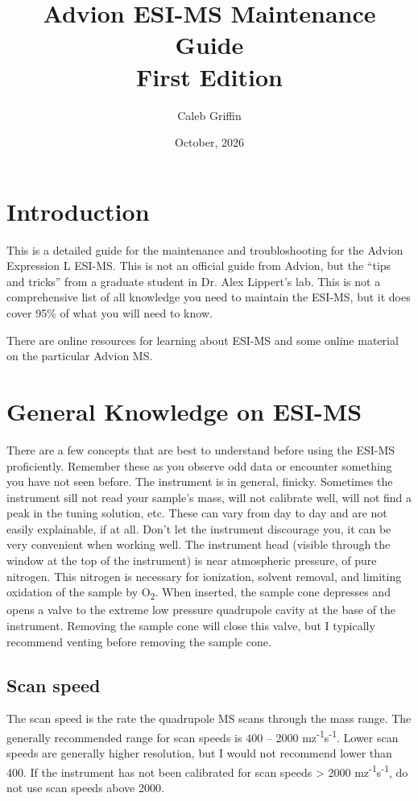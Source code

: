 \documentclass[12pt, letterpaper]{article}
\title{Advion ESI-MS Maintenance Guide\\[0.12in] \large First Edition}
\author{Caleb Griffin}
\date{October, 2026}
\begin{document}
\maketitle
\thispagestyle{empty}

\pagebreak
\tableofcontents
\pagebreak

\section{Introduction}
This is a detailed guide for the maintenance and troubloshooting for the Advion Expression L ESI-MS.
This is not an official guide from Advion, but the ``tips and tricks'' from a graduate student in Dr. Alex Lippert's lab.
This is not a comprehensive list of all knowledge you need to maintain the ESI-MS, but it does cover 95\% of what you will need to know.

There are online resources for learning about ESI-MS and some online material on the particular Advion MS.

\section{General Knowledge on ESI-MS}
There are a few concepts that are best to understand before using the ESI-MS proficiently. 
Remember these as you observe odd data or encounter something you have not seen before.
The instrument is in general, finicky.
Sometimes the instrument sill not read your sample's mass, will not calibrate well, will not find a peak in the tuning solution, etc.
These can vary from day to day and are not easily explainable, if at all.
Don't let the instrument discourage you, it can be very convenient when working well.
The instrument head (visible through the window at the top of the instrument) is near atmospheric pressure, of pure nitrogen.
This nitrogen is necessary for ionization, solvent removal, and limiting oxidation of the sample by O\textsubscript{2}.
When inserted, the sample cone depresses and opens a valve to the extreme low pressure quadrupole cavity at the base of the instrument.
Removing the sample cone will close this valve, but I typically recommend venting before removing the sample cone.

\subsection{Scan speed}
The scan speed is the rate the quadrupole MS scans through the mass range. The generally recommended range for scan speeds is 400 -- 2000 mz\textsuperscript{-1}s\textsuperscript{-1}. 
Lower scan speeds are generally higher resolution, but I would not recommend lower than 400.
If the instrument has not been calibrated for scan speeds > 2000 mz\textsuperscript{-1}s\textsuperscript{-1}, do not use scan speeds above 2000.
\end{document}
